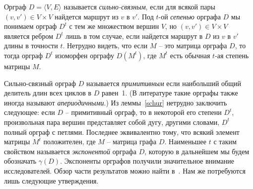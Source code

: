 \documentclass[11pt]{article}
\begin{document}

Орграф $D=\langle V,E\rangle$ называется  \emph{сильно-связным}, 
если для всякой пары $(v,v')\in V\times V$ найдется маршрут из $v$ в $v'$. 
Под $t$-ой \emph{сепенью} орграфа $D$ мы понимаем орграф $D^t$ с тем
же множеством вершин $V$, но $(v,v')\in V\times V$ является ребром $D^t$
лишь в том случае, если найдется маршрут в $D$ из $v$ в $v'$ длины в точности $t$. 
Нетрудно видеть, что если $M$ -- это матрица орграфа $D$, то тогда орграф $D^t$ 
изоморфен орграфу $D(M^t)$, где $M^t$ есть обычная $t$-ая степень матрицы $M$.


Сильно-связный орграф $D$ называется \emph{примитивным} если наибольший общий
делитель длин всех циклов в $D$ равен~1. (В литературе такие орграфы также
иногда называют \emph{апериодичными}.)
Из леммы~\ref{schur} нетрудно заключить следующее: если $D$ -- примитивный
орграф, то в некоторой его степени $D^t$, произвольная пара вершин представляет
собой дугу, другими словами, $D^t$ полный орграф с петлями. Последнее эквивалентно тому,
что всякий элемент матрицы $M^t$ положителен, где $M$ -- матрица графа $D$.
Наименьшее $t$ с таким свойством называется \emph{экспонентой} орграфа $D$, которую 
в дальнейшем мы будем обозначать $\gamma(D)$. Экспоненты орграфов получили значительное 
внимание исследователей. Обзор части результатов можно найти в~\cite{Br}.
Нам же потребуются лишь следующие утверждения.
\end{document}
